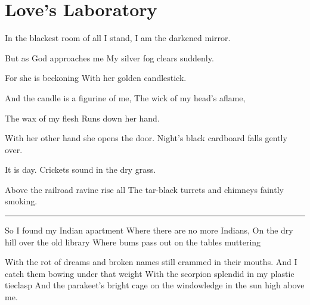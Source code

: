 \documentclass[english,11pt,letterpaper,onecolumn]{scrbook}
\begin{document}
\newpage
\section{Love's Laboratory}

\begin{poem}
\begin{stanza}
In the blackest room of all I stand,\verseline
I am the darkened mirror.
\end{stanza}

\begin{stanza}
But as God approaches me\verseline
My silver fog clears suddenly.
\end{stanza}

\begin{stanza}
For she is beckoning\verseline
With her golden candlestick.
\end{stanza}

\begin{stanza}
And the candle is a figurine of me,\verseline
The wick of my head's aflame,
\end{stanza}

\begin{stanza}
The wax of my flesh \verseline
Runs down her hand.
\end{stanza}

\begin{stanza}
With her other hand she opens the door.\verseline
Night's black cardboard falls gently over.
\end{stanza}

\begin{stanza}
It is day.\verseline
Crickets sound in the dry grass.
\end{stanza}

\begin{stanza}
Above the railroad ravine rise all\verseline
The tar-black turrets and chimneys faintly smoking.
\end{stanza}

\begin{center}\rule[3pt]{2in}{0.5pt}\end{center}

\begin{stanza}
So I found my Indian apartment\verseline
Where there are no more Indians,\verseline
On the dry hill over the old library\verseline
Where bums pass out on the tables muttering
\end{stanza}

\begin{stanza}
With the rot of dreams and broken names still crammed in their mouths.\verseline
And I catch them bowing under that weight\verseline
With the scorpion splendid in my plastic tieclasp\verseline
And the parakeet's bright cage on the windowledge in the sun high above me.
\end{stanza}


\end{poem}
\end{document}
